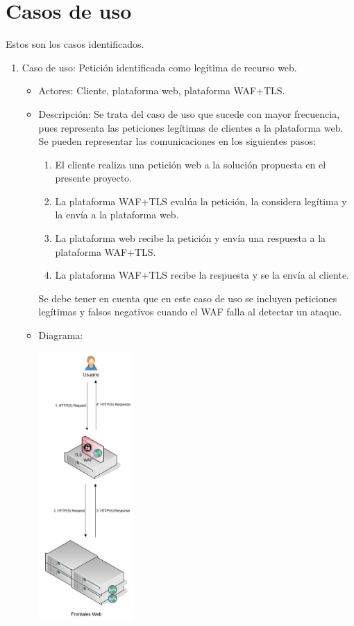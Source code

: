\section{Casos de uso}
\par Estos son los casos identificados.
\begin{enumerate}
  \item Caso de uso: Petición identificada como legítima de recurso web.
    \begin{itemize}
      \item Actores: Cliente, plataforma web, plataforma WAF+TLS.
      \item Descripción: Se trata del caso de uso que sucede con mayor frecuencia, pues representa las peticiones legítimas de clientes a la plataforma web. Se pueden representar las comunicaciones en los siguientes pasos:
        \begin{enumerate}
          \item El cliente realiza una petición web a la solución propuesta en el presente proyecto.
          \item La plataforma WAF+TLS evalúa la petición, la considera legítima y la envía a la plataforma web.
          \item La plataforma web recibe la petición y envía una respuesta a la plataforma WAF+TLS.
          \item La plataforma WAF+TLS recibe la respuesta y se la envía al cliente.
        \end{enumerate}
        \par Se debe tener en cuenta que en este caso de uso se incluyen peticiones legítimas y falsos negativos cuando el WAF falla al detectar un ataque.
      \item Diagrama:
        \begin{center}
          \label{fig:CasoUso1}
          \includegraphics[width=0.3\textwidth]{fig/UseCase1}

\end{center}
\end{itemize}
\end{enumerate}
